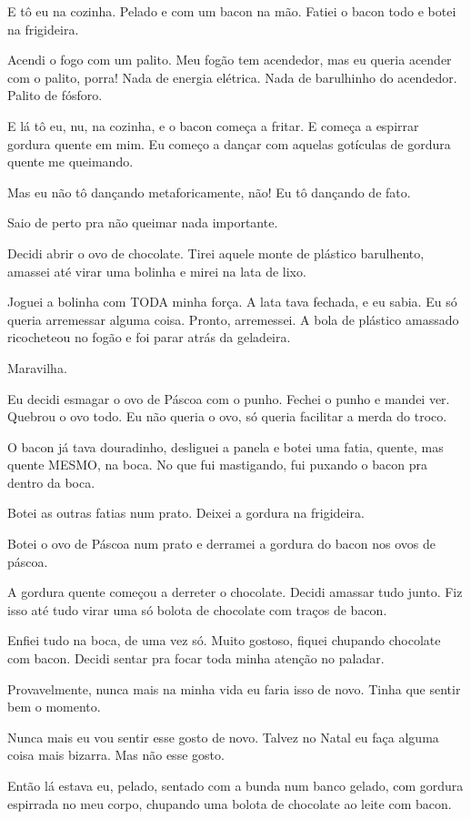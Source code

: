 E tô eu na cozinha. Pelado e com um bacon na mão. Fatiei o bacon todo e botei na frigideira.

Acendi o fogo com um palito. Meu fogão tem acendedor, mas eu queria acender com o palito, porra! Nada de energia elétrica. Nada de barulhinho do acendedor. Palito de fósforo.

E lá tô eu, nu, na cozinha, e o bacon começa a fritar. E começa a espirrar gordura quente em mim. Eu começo a dançar com aquelas gotículas de gordura quente me queimando.

Mas eu não tô dançando metaforicamente, não! Eu tô dançando de fato.

Saio de perto pra não queimar nada importante.

Decidi abrir o ovo de chocolate. Tirei aquele monte de plástico barulhento, amassei até virar uma bolinha e mirei na lata de lixo.

Joguei a bolinha com TODA minha força. A lata tava fechada, e eu sabia. Eu só queria arremessar alguma coisa. Pronto, arremessei. A bola de plástico amassado ricocheteou no fogão e foi parar atrás da geladeira.

Maravilha.

Eu decidi esmagar o ovo de Páscoa com o punho. Fechei o punho e mandei ver. Quebrou o ovo todo. Eu não queria o ovo, só queria facilitar a merda do troco.

O bacon já tava douradinho, desliguei a panela e botei uma fatia, quente, mas quente MESMO, na boca. No que fui mastigando, fui puxando o bacon pra dentro da boca.

Botei as outras fatias num prato. Deixei a gordura na frigideira.

Botei o ovo de Páscoa num prato e derramei a gordura do bacon nos ovos de páscoa.

A gordura quente começou a derreter o chocolate. Decidi amassar tudo junto. Fiz isso até tudo virar uma só bolota de chocolate com traços de bacon.

Enfiei tudo na boca, de uma vez só. Muito gostoso, fiquei chupando chocolate com bacon. Decidi sentar pra focar toda minha atenção no paladar.

Provavelmente, nunca mais na minha vida eu faria isso de novo. Tinha que sentir bem o momento.

Nunca mais eu vou sentir esse gosto de novo. Talvez no Natal eu faça alguma coisa mais bizarra. Mas não esse gosto.

Então lá estava eu, pelado, sentado com a bunda num banco gelado, com gordura espirrada no meu corpo, chupando uma bolota de chocolate ao leite com bacon.

